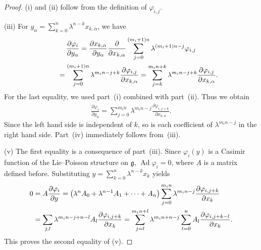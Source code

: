 \documentclass[10pt,a4paper]{amsart}
\numberwithin{equation}{section}
\begin{document}
\begin{proof}
(i) and (ii) follow from the def\/inition of $\varphi _{i,j}$.

(iii) For $y_\alpha = \sum\limits^n_{k=0}\lambda ^{n-k}x_{k,\alpha }$, we have
\begin{gather*}
\frac{\partial \varphi _i}{\partial y_\alpha }= \frac{\partial x_{k,\alpha }}{\partial y_\alpha }\frac{\partial }{\partial x_{k,\alpha }}
 \sum^{(m_i+1)n}_{j=0}\lambda ^{(m_i+1)n-j}\varphi _{i,j} \\
\hphantom{\frac{\partial \varphi _i}{\partial y_\alpha }}{}
= \sum^{(m_i+1)n}_{j=0} \lambda ^{m_in-j+k}\frac{\partial \varphi _{i,j}}{\partial x_{k,\alpha }}
= \sum^{m_in + k}_{j=k} \lambda ^{m_in-j+k}\frac{\partial \varphi _{i,j}}{\partial x_{k,\alpha }}.
\end{gather*}
For the last equality, we used part~(i) combined with part~(ii). Thus we obtain
\begin{gather*}
\frac{\partial \varphi _i}{\partial y_\alpha } = \sum^{m_in}_{j=0} \lambda ^{m_in-j}\frac{\partial \varphi _{i,j+k}}{\partial x_{k,\alpha }}.
\end{gather*}
Since the left hand side is independent of $k$, so is each coef\/f\/icient of $\lambda ^{m_in-j}$ in the right hand side. Part~(iv) immediately follows from~(iii).

(v) The f\/irst equality is a consequence of part~(iii). Since $\varphi _i(y)$ is a Casimir function of the Lie--Poisson structure on $\mathfrak{g}$,
$\operatorname{Ad}\varphi _i =0$, where $A$ is a matrix def\/ined before. Substituting $y = \sum\limits^n_{k=0}\lambda ^{n-k}x_k$ yields{\samepage
\begin{gather*}
\begin{split}
& 0= A \frac{\partial \varphi _i}{\partial y}
= \big(\lambda ^nA_0 + \lambda ^{n-1}A_1 + \dots + A_n\big) \sum^{m_in}_{j=0} \lambda ^{m_in-j}\frac{\partial \varphi _{i,j+k}}{\partial x_{k}} \\
& \hphantom{0}{} = \sum_{j,l} \lambda ^{m_in-j+n-l}A_l \frac{\partial \varphi _{i,j+k}}{\partial x_{k}}
= \sum^{m_in+l}_{j=l} \lambda ^{m_in+n-j} \sum^n_{l=0} A_l\frac{\partial \varphi _{i,j+k-l}}{\partial x_{k}}.
\end{split}
\end{gather*}
This proves the second equality of (v).}


\end{proof}
\end{document}
